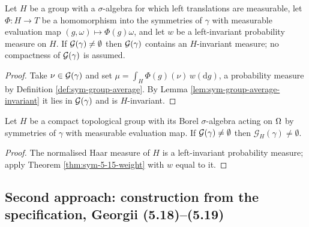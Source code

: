\begin{theorem}
    \label{thm:sym-5-15-weight}
    \leanok

    Let $H$ be a group with a $\sigma$-algebra for which left translations are measurable, let
    $\Phi : H \to T$ be a homomorphism into the symmetries of $\gamma$ with measurable
    evaluation map $(g,\omega) \mapsto \Phi(g)\omega$, and let $w$ be a left-invariant
    probability measure on $H$. If $\mathcal{G}(\gamma) \neq \emptyset$ then $\mathcal{G}(\gamma)$
    contains an $H$-invariant measure; no compactness of $\mathcal{G}(\gamma)$ is assumed.
\end{theorem}
\begin{proof}
    \leanok

    Take $\nu \in \mathcal{G}(\gamma)$ and set $\mu = \int_H \Phi(g)(\nu)\, w(\mathrm{d}g)$, a
    probability measure by Definition \ref{def:sym-group-average}. By
    Lemma \ref{lem:sym-group-average-invariant} it lies in $\mathcal{G}(\gamma)$ and is
    $H$-invariant.
\end{proof}

\begin{corollary}
    \label{cor:sym-5-16-compact}
    \leanok

    Let $H$ be a compact topological group with its Borel $\sigma$-algebra acting on $\Omega$ by
    symmetries of $\gamma$ with measurable evaluation map. If $\mathcal{G}(\gamma) \neq \emptyset$
    then $\mathcal{G}_H(\gamma) \neq \emptyset$.
\end{corollary}
\begin{proof}
    \leanok

    The normalised Haar measure of $H$ is a left-invariant probability measure; apply
    Theorem \ref{thm:sym-5-15-weight} with $w$ equal to it.
\end{proof}

\subsection*{Second approach: construction from the specification, Georgii (5.18)--(5.19)}

